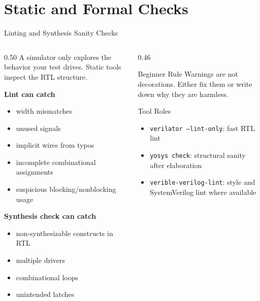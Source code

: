 \documentclass[aspectratio=169,10pt]{beamer}
\begin{document}
\section{Static and Formal Checks}

\begin{frame}{Linting and Synthesis Sanity Checks}
  \begin{columns}[T]
    \begin{column}{0.50\textwidth}
      A simulator only explores the behavior your test drives. Static tools inspect the RTL structure.

      \vspace{0.7em}
      \textbf{Lint can catch}
      \begin{itemize}
        \item width mismatches
        \item unused signals
        \item implicit wires from typos
        \item incomplete combinational assignments
        \item suspicious blocking/nonblocking usage
      \end{itemize}

      \vspace{0.7em}
      \textbf{Synthesis check can catch}
      \begin{itemize}
        \item non-synthesizable constructs in RTL
        \item multiple drivers
        \item combinational loops
        \item unintended latches
      \end{itemize}
    \end{column}
    \begin{column}{0.46\textwidth}
      \begin{block}{Beginner Rule}
        Warnings are not decorations. Either fix them or write down why they are harmless.
      \end{block}

      \vspace{0.7em}
      \begin{exampleblock}{Tool Roles}
        \begin{itemize}\small
          \item \texttt{verilator --lint-only}: fast RTL lint
          \item \texttt{yosys check}: structural sanity after elaboration
          \item \texttt{verible-verilog-lint}: style and SystemVerilog lint where available
        \end{itemize}
      \end{exampleblock}
    \end{column}
  \end{columns}
\end{frame}
\end{document}
